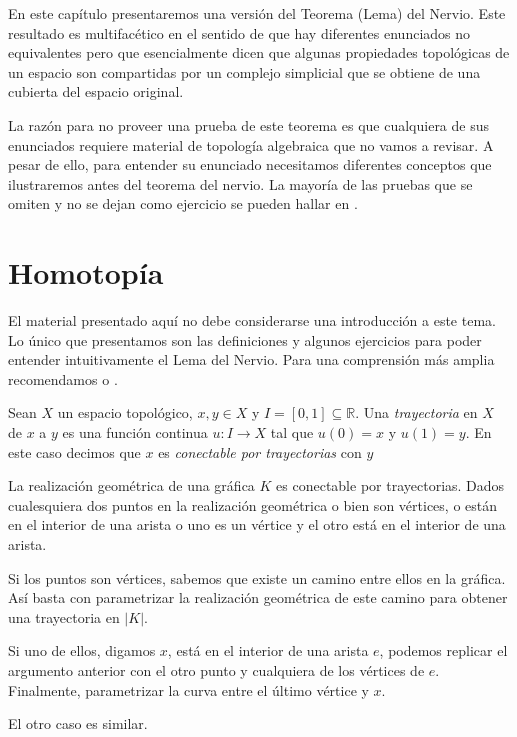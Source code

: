 \documentclass{standalone}
\begin{document}
	En este capítulo presentaremos una versión del Teorema (Lema) del Nervio. Este resultado es multifacético en el sentido de que hay diferentes enunciados no equivalentes pero que esencialmente dicen que algunas propiedades topológicas de un espacio son compartidas por un complejo simplicial  que se obtiene de una cubierta del espacio original.
	
	La razón para no proveer una prueba de este teorema es que cualquiera de sus enunciados requiere material de topología algebraica que no vamos a revisar. A pesar de ello, para entender su enunciado necesitamos diferentes conceptos que ilustraremos antes del teorema del nervio.  La mayoría de las pruebas que se omiten y no se dejan como ejercicio se pueden hallar en \cite{dieck:2008:algebraic:topology,munkres:1984:algebraic:topology,rotman:1988:algebraic:topology}. 
	
	\section*{Homotopía}
	El material presentado aquí no debe considerarse una introducción a este tema. Lo único que presentamos son las definiciones y algunos ejercicios para poder entender intuitivamente el Lema del Nervio. Para una comprensión más amplia recomendamos \cite{dieck:2008:algebraic:topology} o \cite{rotman:1988:algebraic:topology}.
	
	\begin{definition}\label{defn:path}
		Sean $X$ un espacio topológico, $x,y\in X$ y $I=[0,1]\subseteq\mathbb{R}$. Una \emph{trayectoria} en $X$ de $x$ a $y$ es una función continua $u\colon I\rightarrow X$ tal que $u(0)=x$ y $u(1)=y$. En este caso decimos que $x$ es \emph{conectable por trayectorias} con $y$
	\end{definition}
	
	\begin{example}
		La realización geométrica de una gráfica $K$ es conectable por trayectorias. Dados cualesquiera dos puntos en la realización geométrica o bien son vértices, o están en el interior de una arista o uno es un vértice y el otro está en el interior de una arista.
		
		Si los puntos son vértices, sabemos que existe un camino entre ellos en la gráfica. Así basta con parametrizar la realización geométrica de este camino para obtener una trayectoria en $|K|$.
		
		Si uno de ellos, digamos $x$, está en el interior de una arista $e$, podemos replicar el argumento anterior con el otro punto y cualquiera de los vértices de $e$. Finalmente, parametrizar la curva entre el último vértice y $x$.
		
		El otro caso es similar.
	\end{example}
	
\end{document}
